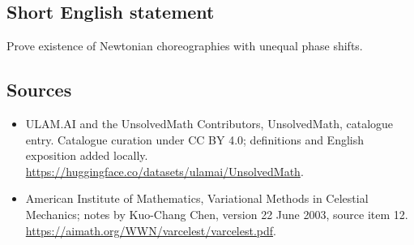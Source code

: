 \documentclass[11pt]{article}
\begin{document}
\subsection{Short English statement}
Prove existence of Newtonian choreographies with unequal phase shifts.
\subsection{Sources}
\begin{itemize}
\item[\hypertarget{source:statement:1}{S1}] ULAM.AI and the UnsolvedMath Contributors, UnsolvedMath, catalogue entry. Catalogue curation under CC BY 4.0; definitions and English exposition added locally.
\url{https://huggingface.co/datasets/ulamai/UnsolvedMath}.
\item[\hypertarget{source:statement:2}{S2}] American Institute of Mathematics, Variational Methods in Celestial Mechanics; notes by Kuo-Chang Chen, version 22 June 2003, source item 12.
\url{https://aimath.org/WWN/varcelest/varcelest.pdf}.
\end{itemize}
\label{end:statement}
\end{document}
